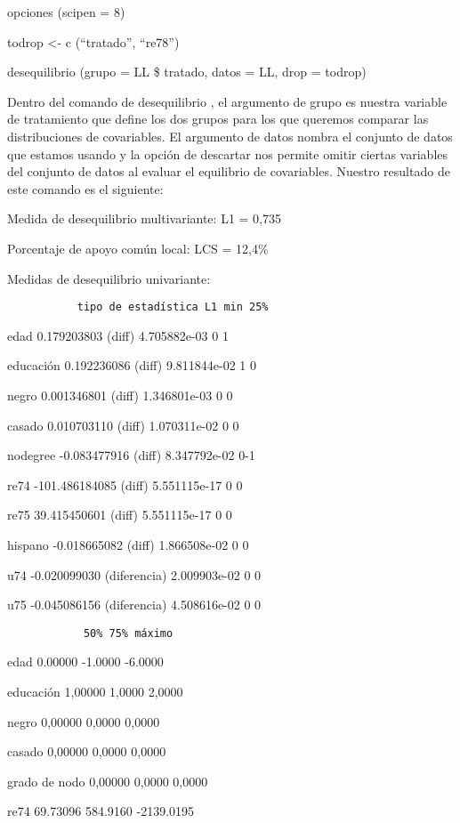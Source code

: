 \documentclass[
]{book}
\begin{document}
opciones (scipen = 8)

todrop \textless- c (``tratado'', ``re78'')

desequilibrio (grupo = LL \$ tratado, datos = LL, drop = todrop)

Dentro del comando de desequilibrio , el argumento de grupo es nuestra variable de tratamiento que define los dos grupos para los que queremos comparar las distribuciones de covariables. El argumento de datos nombra el conjunto de datos que estamos usando y la opción de descartar nos permite omitir ciertas variables del conjunto de datos al evaluar el equilibrio de covariables. Nuestro resultado de este comando es el siguiente:

Medida de desequilibrio multivariante: L1 = 0,735

Porcentaje de apoyo común local: LCS = 12,4\%

Medidas de desequilibrio univariante:

\begin{verbatim}
           tipo de estadística L1 min 25%
\end{verbatim}

edad 0.179203803 (diff) 4.705882e-03 0 1

educación 0.192236086 (diff) 9.811844e-02 1 0

negro 0.001346801 (diff) 1.346801e-03 0 0

casado 0.010703110 (diff) 1.070311e-02 0 0

nodegree -0.083477916 (diff) 8.347792e-02 0-1

re74 -101.486184085 (diff) 5.551115e-17 0 0

re75 39.415450601 (diff) 5.551115e-17 0 0

hispano -0.018665082 (diff) 1.866508e-02 0 0

u74 -0.020099030 (diferencia) 2.009903e-02 0 0

u75 -0.045086156 (diferencia) 4.508616e-02 0 0

\begin{verbatim}
            50% 75% máximo
\end{verbatim}

edad 0.00000 -1.0000 -6.0000

educación 1,00000 1,0000 2,0000

negro 0,00000 0,0000 0,0000

casado 0,00000 0,0000 0,0000

grado de nodo 0,00000 0,0000 0,0000

re74 69.73096 584.9160 -2139.0195
\end{document}
